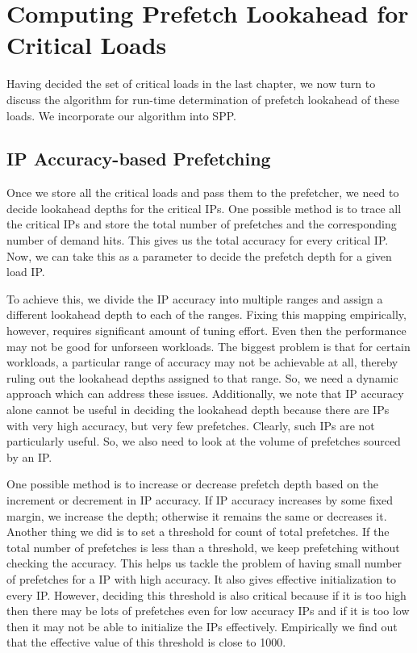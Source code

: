 \chapter{Computing Prefetch Lookahead for Critical Loads}\label{Chapter4:Methods to predict Look ahead depth for critical delays}
Having decided the set of critical loads in the last chapter, we now turn to discuss the algorithm for run-time determination of prefetch lookahead of these loads. We incorporate our algorithm into SPP.

\section{IP Accuracy-based Prefetching}

Once we store all the critical loads and pass them to the prefetcher, we need to decide lookahead depths for the critical
IPs. One possible method is to trace all the critical IPs and store the total number of prefetches and the corresponding number of demand hits. This gives us the total accuracy for every critical IP. Now, we can take this as a parameter to decide the prefetch
depth for a given load IP.

To achieve this, we divide the IP accuracy into multiple ranges and assign a different lookahead depth to each
of the ranges. Fixing this mapping empirically, however, requires significant amount of tuning effort. Even then the performance may not be good for unforseen workloads. The biggest problem is that for certain workloads, a particular range of accuracy may not be achievable at all, thereby ruling out the lookahead depths assigned to that range. So, we need a dynamic approach which can address these issues. Additionally,
we note that IP accuracy alone cannot be useful in deciding the lookahead depth because there are IPs with very high accuracy, but very few prefetches. Clearly, such IPs are not particularly useful. So, we also need to look at the volume of prefetches sourced by an IP.

One possible method is to increase or decrease prefetch depth based on the increment or decrement in
IP accuracy. If IP accuracy increases by some fixed margin, we increase the depth; otherwise it
remains the same or decreases it.
Another thing we did is to set a threshold for count of total
prefetches. If the total number of prefetches is less than a threshold, we keep prefetching without checking the
accuracy. This helps us tackle the problem of having small number of prefetches for a IP with high
accuracy. It also gives effective initialization to every IP. However, deciding this threshold is also
critical because if it is too high then there may be lots of prefetches even for low accuracy IPs
and if it is too low then it may not be able to initialize the IPs effectively. Empirically we find out that the effective value of this threshold is close to 1000.

